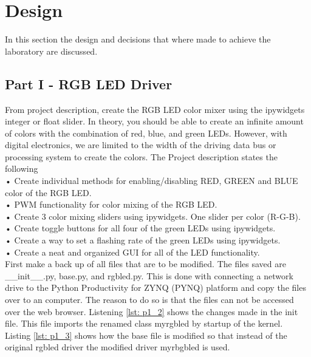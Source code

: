 \section{Design}\label{sec: Design}
In this section the design and decisions that where made to achieve the laboratory are discussed.

\subsection{Part I - RGB LED Driver}\label{subsec: Jupyter Notebook}
From project description, create the RGB LED color mixer using the ipywidgets integer or float slider. In theory, you should be able to create an infinite amount of colors with the combination of red, blue, and green LEDs. However, with digital electronics, we are limited to the width of the driving data bus or processing system to create the colors. The Project description states the following \cite{Parikh2018}\\

• Create individual methods for enabling/disabling RED, GREEN and BLUE color of the RGB LED.\\

• PWM functionality for color mixing of the RGB LED.\\

• Create 3 color mixing sliders using ipywidgets. One slider per color (R-G-B).\\

• Create toggle buttons for all four of the green LEDs using ipywidgets.\\

• Create a way to set a flashing rate of the green LEDs using ipywidgets.\\

• Create a neat and organized GUI for all of the LED functionality. \\

First make a back up of all files that are to be modified. The files saved are \_\_init\_\_.py, base.py, and rgbled.py. This is done with connecting a network drive to the Python Productivity for ZYNQ (PYNQ) platform and copy the files over to an computer. The reason to do so is that the files can not be accessed over the web browser. Listening \ref{lst: p1_2} shows the changes made in the init file. This file imports the renamed class myrgbled by startup of the kernel. Listing \ref{lst: p1_3} shows how the base file is modified so that instead of the original rgbled driver the modified driver myrbgbled is used.

